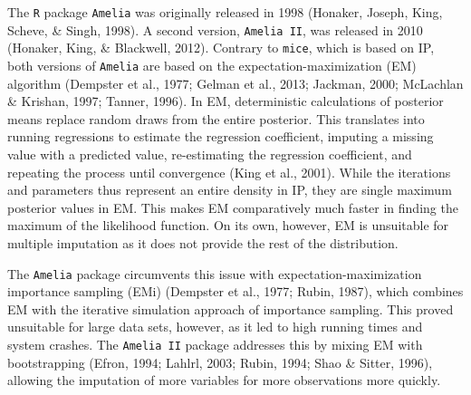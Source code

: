 \documentclass[12pt,econ]{sources/authesis}
\begin{document}
The \texttt{R} package \texttt{Amelia} was originally released in 1998 (Honaker, Joseph, King, Scheve, \& Singh, 1998). A second version, \texttt{Amelia\ II}, was released in 2010 (Honaker, King, \& Blackwell, 2012). Contrary to \texttt{mice}, which is based on IP, both versions of \texttt{Amelia} are based on the expectation-maximization (EM) algorithm (Dempster et al., 1977; Gelman et al., 2013; Jackman, 2000; McLachlan \& Krishan, 1997; Tanner, 1996). In EM, deterministic calculations of posterior means replace random draws from the entire posterior. This translates into running regressions to estimate the regression coefficient, imputing a missing value with a predicted value, re-estimating the regression coefficient, and repeating the process until convergence (King et al., 2001). While the iterations and parameters thus represent an entire density in IP, they are single maximum posterior values in EM. This makes EM comparatively much faster in finding the maximum of the likelihood function. On its own, however, EM is unsuitable for multiple imputation as it does not provide the rest of the distribution.

The \texttt{Amelia} package circumvents this issue with expectation-maximization importance sampling (EMi) (Dempster et al., 1977; Rubin, 1987), which combines EM with the iterative simulation approach of importance sampling. This proved unsuitable for large data sets, however, as it led to high running times and system crashes. The \texttt{Amelia\ II} package addresses this by mixing EM with bootstrapping (Efron, 1994; Lahlrl, 2003; Rubin, 1994; Shao \& Sitter, 1996), allowing the imputation of more variables for more observations more quickly.
\end{document}
